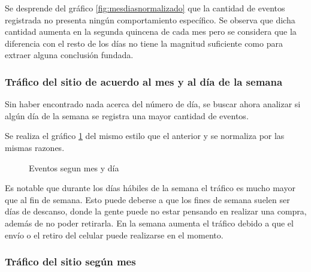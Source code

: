 \documentclass[a4paper]{article}
\begin{document}
Se desprende del gráfico \ref{fig:mesdiasnormalizado} que la cantidad de eventos registrada no presenta ningún comportamiento específico. Se observa que dicha cantidad aumenta en la segunda quincena de cada mes pero se considera que la diferencia con el resto de los días no tiene la magnitud suficiente como para extraer alguna conclusión fundada. 

\subsubsection{Tráfico del sitio de acuerdo al mes y al día de la semana}

Sin haber encontrado nada acerca del número de día, se buscar ahora analizar si algún día de la semana se registra una mayor cantidad de eventos. 

Se realiza el gráfico \ref{fig:messemanasnormalizado} del mismo estilo que el anterior y se normaliza por las mismas razones.

\begin{figure}[h!]
	\caption{Eventos segun mes y día}
	\label{fig:messemanasnormalizado}
\end{figure}

Es notable que durante los días hábiles de la semana el tráfico es mucho mayor que al fin de semana. Esto puede deberse a que los fines de semana suelen ser días de descanso, donde la gente puede no estar pensando en realizar una compra, además de no poder retirarla. En la semana aumenta el tráfico debido a que el envío o el retiro del celular puede realizarse en el momento.

\subsubsection{Tráfico del sitio según mes}
\end{document}
